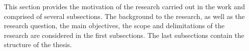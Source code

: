 %
%
This section provides the motivation of the research carried out in the work and comprised of 
several subsections. 
%
The background to the research, as well as the research question, the main objectives, the scope 
and delimitations of the research are considered in the first subsections. 
%
The last subsections contain the structure of the thesis. 